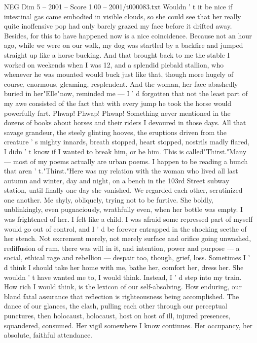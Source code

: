 \begin{textsample}{NEG Dim 5 – 2001 – Score 1.00 – 2001/t000083.txt}
Wouldn ' t it be nice if intestinal gas came embodied in visible clouds, so she could see that her really quite inoffensive pop had only barely grazed my face before it drifted away.
Besides, for this to have happened now is a nice coincidence.
Because not an hour ago, while we were on our walk, my dog was startled by a backfire and jumped straight up like a horse bucking.
And that brought back to me the stable I worked on weekends when I was 12, and a splendid piebald stallion, who whenever he was mounted would buck just like that, though more hugely of course, enormous, gleaming, resplendent.
And the woman, her face abashedly buried in her"Elle"now, reminded me — I ' d forgotten that not the least part of my awe consisted of the fact that with every jump he took the horse would powerfully fart.
Phwap!
Phwap!
Phwap!
Something never mentioned in the dozens of books about horses and their riders I devoured in those days.
All that savage grandeur, the steely glinting hooves, the eruptions driven from the creature ' s mighty innards, breath stopped, heart stopped, nostrils madly flared, I didn ' t know if I wanted to break him, or be him.
This is called"Thirst."Many — most of my poems actually are urban poems.
I happen to be reading a bunch that aren ' t."Thirst."Here was my relation with the woman who lived all last autumn and winter, day and night, on a bench in the 103rd Street subway station, until finally one day she vanished.
We regarded each other, scrutinized one another.
Me shyly, obliquely, trying not to be furtive.
She boldly, unblinkingly, even pugnaciously, wrathfully even, when her bottle was empty.
I was frightened of her.
I felt like a child.
I was afraid some repressed part of myself would go out of control, and I ' d be forever entrapped in the shocking seethe of her stench.
Not excrement merely, not merely surface and orifice going unwashed, rediffusion of rum, there was will in it, and intention, power and purpose — a social, ethical rage and rebellion — despair too, though, grief, loss.
Sometimes I ' d think I should take her home with me, bathe her, comfort her, dress her.
She wouldn ' t have wanted me to, I would think.
Instead, I ' d step into my train.
How rich I would think, is the lexicon of our self-absolving.
How enduring, our bland fatal assurance that reflection is righteousness being accomplished.
The dance of our glances, the clash, pulling each other through our perceptual punctures, then holocaust, holocaust, host on host of ill, injured presences, squandered, consumed.
Her vigil somewhere I know continues.
Her occupancy, her absolute, faithful attendance.

\end{textsample}
